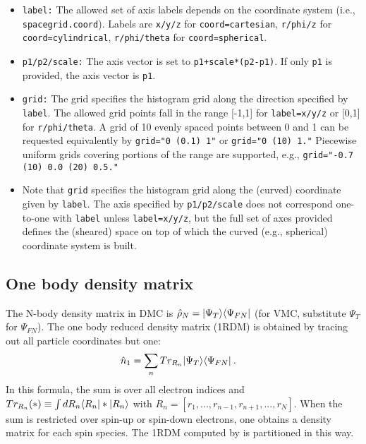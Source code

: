 \begin{itemize}
  \item{\texttt{label:} The allowed set of axis labels depends on the coordinate system (i.e., \texttt{spacegrid.coord}).  Labels are \texttt{x/y/z} for \texttt{coord=cartesian}, \texttt{r/phi/z} for \texttt{coord=cylindrical}, \texttt{r/phi/theta} for \texttt{coord=spherical}.}
  \item{\texttt{p1/p2/scale:} The axis vector is set to \texttt{p1+scale*(p2-p1)}.  If only \texttt{p1} is provided, the axis vector is \texttt{p1}.}
  \item{\texttt{grid:} The grid specifies the histogram grid along the direction specified by \texttt{label}.  The allowed grid points fall in the range [-1,1] for \texttt{label=x/y/z} or [0,1] for \texttt{r/phi/theta}.  A grid of 10 evenly spaced points between 0 and 1 can be requested equivalently by \texttt{grid="0 (0.1) 1"} or  \texttt{grid="0 (10) 1."}  Piecewise uniform grids covering portions of the range are supported, e.g., \texttt{grid="-0.7 (10) 0.0 (20) 0.5."}  }
  \item{Note that \texttt{grid} specifies the histogram grid along the (curved) coordinate given by \texttt{label}.  The axis specified by \texttt{p1/p2/scale} does not correspond one-to-one with \texttt{label} unless \texttt{label=x/y/z}, but the full set of axes provided defines the (sheared) space on top of which the curved (e.g., spherical) coordinate system is built. }
\end{itemize}






\subsection{One body density matrix}
The N-body density matrix in DMC is $\hat{\rho}_N=\lvert \Psi_{T} \rangle  \langle \Psi_{FN} \rvert$ (for VMC, substitute $\Psi_T$ for $\Psi_{FN}$).  The one body reduced density matrix (1RDM) is obtained by tracing out all particle coordinates but one:
\begin{align}
  \hat{n}_1 &= \sum_nTr_{R_n}\lvert \Psi_{T} \rangle  \langle \Psi_{FN} \rvert\:.
\end{align}
In this formula, the sum is over all electron indices and $Tr_{R_n}(*)\equiv\int dR_n\langle R_n \rvert*\lvert R_n \rangle$ with $R_n=[r_1,...,r_{n-1},r_{n+1},...,r_N]$.  When the sum is restricted over spin-up or spin-down electrons, one obtains a density matrix for each spin species.  The 1RDM computed by \qmcpack is partitioned in this way.

